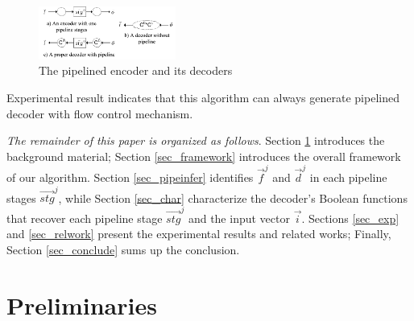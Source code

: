 \documentclass[conference]{IEEEtran}
\begin{document}
\begin{figure}[b]
\begin{center}
\includegraphics[width=0.4\textwidth]{pipeline}
\end{center}
\caption{The pipelined encoder and its decoders}
\label{fig_pipe}
\end{figure}


Experimental result indicates that this algorithm can always 
generate pipelined decoder with flow control mechanism.

\emph{The remainder of this paper is organized as follows}.
Section \ref{sec_prem} introduces the background material;
Section \ref{sec_framework} introduces the overall framework of our algorithm.
Section \ref{sec_pipeinfer} identifies $\vec{f}^j$ and $\vec{d}^j$ in each pipeline stages $\vec{stg}^j$,
while Section \ref{sec_char} characterize the decoder's Boolean functions that recover each pipeline stage $\vec{stg}^j$ and the input vector $\vec{i}$.
Sections \ref{sec_exp} and \ref{sec_relwork} present the experimental results and related works;
Finally,
Section \ref{sec_conclude} sums up the conclusion.

\section{Preliminaries}\label{sec_prem}

\end{document}
